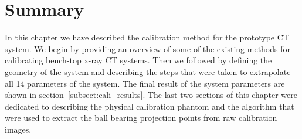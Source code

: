 \section{Summary}
In this chapter we have described the calibration method for the prototype CT system.  We begin by providing an overview of some of the existing methods for calibrating bench-top x-ray CT systems.  Then we followed by defining the geometry of the system and describing the steps that were taken to extrapolate all 14 parameters of the system.  The final result of the system parameters are shown in section~\ref{subsect:cali_results}.  The last two sections of this chapter were dedicated to describing the physical calibration phantom and the algorithm that were used to extract the ball bearing projection points from raw calibration images.  

%
%
